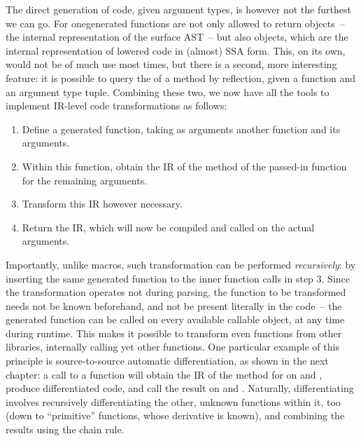 The direct generation of code, given argument types, is however not the furthest we can go.  For
onegenerated functions are not only allowed to return  objects~-- the internal
representation of the surface AST~-- but also  objects, which are the internal
representation of lowered code in (almost) SSA form.  This, on its own, would not be of much use
most times, but there is a second, more interesting feature: it is possible to query the
 of a method by reflection, given a function and an argument type tuple.  Combining
these two, we now have all the tools to implement IR-level code transformations as follows:
\begin{enumerate}
  \firmlist
\item Define a generated function, taking as arguments another function and its arguments.
\item Within this function, obtain the IR of the method of the passed-in function for the remaining
  arguments.
\item Transform this IR however necessary.
\item Return the IR, which will now be compiled and called on the actual arguments.
\end{enumerate}
Importantly, unlike macros, such transformation can be performed \emph{recursively}: by inserting
the same generated function to the inner function calls in step 3.  Since the transformation
operates not during parsing, the function to be transformed needs not be known beforehand, and not
be present literally in the code~-- the generated function can be called on every available callable
object, at any time during runtime.  This makes it possible to transform even functions from other
libraries, internally calling yet other functions.  One particular example of this principle is
source-to-source automatic differentiation, as shown in the next chapter: a call to a function
 will obtain the IR of the method for  on  and
, produce differentiated code, and call the result on  and .
Naturally, differentiating  involves recursively differentiating the other, unknown
functions within it, too (down to \enquote{primitive} functions, whose derivative is known), and
combining the results using the chain rule.

